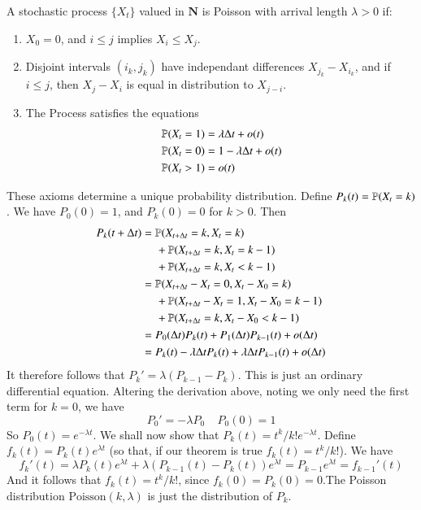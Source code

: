 \begin{definition}
    A stochastic process $\{ X_t \}$ valued in $\mathbf{N}$ is Poisson with arrival length $\lambda > 0$ if:
    \begin{enumerate}
        \item $X_0 = 0$, and $i \leq j$ implies $X_i \leq X_j$.
        \item Disjoint intervals $(i_k, j_k)$ have independant differences $X_{j_k} - X_{i_k}$, and if $i \leq j$, then $X_j - X_i$ is equal in distribution to $X_{j-i}$.
        \item The Process satisfies the equations
        \begin{align}
            &\label{posson1} \operatorname{\mathbb{P}}(X_t = 1) = \lambda \Delta t + o(t)\\
            &\label{poisson2} \operatorname{\mathbb{P}}(X_t = 0) = 1 - \lambda \Delta t + o(t)\\
            &\label{poisson3} \operatorname{\mathbb{P}}(X_t > 1) = o(t)
        \end{align}
    \end{enumerate}
\end{definition}

These axioms determine a unique probability distribution. Define $P_k(t) = \operatorname{\mathbb{P}}(X_t = k)$. We have $P_0(0) = 1$, and $P_k(0) = 0$ for $k > 0$. Then
%
\begin{align*}
    P_k(t + \Delta t) &= \operatorname{\mathbb{P}}(X_{t + \Delta t} = k, X_t = k)\\
    &\ \ \ \ \ + \operatorname{\mathbb{P}}(X_{t + \Delta t} = k, X_t = k - 1)\\
    &\ \ \ \ \ + \operatorname{\mathbb{P}}(X_{t + \Delta t} = k, X_t < k - 1)\\
    &= \operatorname{\mathbb{P}}(X_{t + \Delta t} - X_t = 0, X_t - X_0 = k)\\
    &\ \ \ \ \ + \operatorname{\mathbb{P}}(X_{t + \Delta t} - X_t = 1, X_t - X_0 = k-1)\\
    &\ \ \ \ \ + \operatorname{\mathbb{P}}(X_{t + \Delta t} = k, X_t - X_0 < k - 1)\\
    &= P_0(\Delta t) P_k(t) + P_1(\Delta t) P_{k-1}(t) + o(\Delta t)\\
    &= P_k(t) - \lambda \Delta t P_k(t) + \lambda \Delta t P_{k-1}(t) + o(\Delta t)
\end{align*}
%
It therefore follows that $P_k' = \lambda(P_{k-1} - P_k)$. This is just an ordinary differential equation. Altering the derivation above, noting we only need the first term for $k = 0$, we have
%
\[ P_0' = - \lambda P_0\ \ \ \ \ P_0(0) = 1 \]
%
So $P_0(t) = e^{-\lambda t}$. We shall now show that $P_k(t) = t^k/k! e^{-\lambda t}$. Define $f_k(t) = P_k(t) e^{\lambda t}$ (so that, if our theorem is true $f_k(t) = t^k/k!$). We have
%
\[ f_k'(t) = \lambda P_k(t) e^{\lambda t} + \lambda (P_{k - 1}(t) - P_k(t)) e^{\lambda t} = P_{k - 1} e^{\lambda t} = f_{k - 1}'(t) \]
%
And it follows that $f_k(t) = t^k/k!$, since $f_k(0) = P_k(0) = 0$.The Poisson distribution $\text{Poisson}(k,\lambda)$ is just the distribution of $P_k$.


